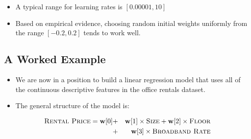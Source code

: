 \documentclass[xcolor={table}]{beamer}
\newcommand{\featN}[1]{\textsc{#1}}
\begin{document}
\begin{frame}
\begin{itemize}
\item A typical range for learning rates is $[0.00001, 10]$ 
\item Based on empirical evidence, choosing random initial weights uniformly from the range $[-0.2, 0.2]$ tends to work well.
\end{itemize}
\end{frame}

\subsection{A Worked Example}

 \begin{frame} 
 \begin{itemize}
 	\item We are now in a position to build a linear regression model that uses all of the continuous descriptive features in the office rentals dataset. 
	\item The general structure of the model is:
\end{itemize}
\begin{eqnarray*}
	\featN{Rental~Price}  =  \mathbf{w}[0] 	& + &  \mathbf{w}[1] \times \featN{Size} + \mathbf{w}[2] \times \featN{Floor}	\\
 														& + &  \mathbf{w}[3] \times \featN{Broadband~Rate}
\end{eqnarray*}
\end{frame} 
\end{document}
